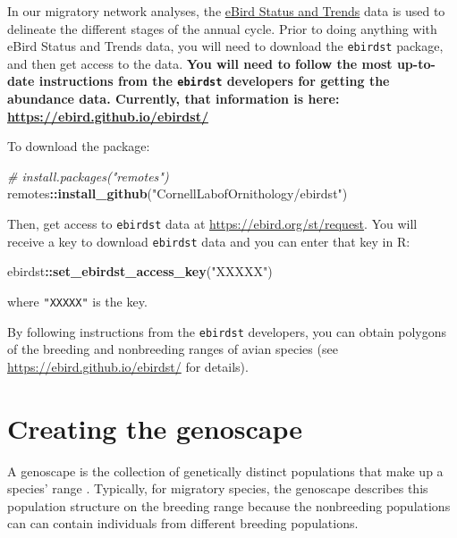 \documentclass[
]{book}
\newenvironment{Shaded}{\begin{snugshade}}{\end{snugshade}}
\newcommand{\CommentTok}[1]{\textcolor[rgb]{0.56,0.35,0.01}{\textit{#1}}}
\newcommand{\FunctionTok}[1]{\textcolor[rgb]{0.13,0.29,0.53}{\textbf{#1}}}
\newcommand{\NormalTok}[1]{#1}
\newcommand{\SpecialCharTok}[1]{\textcolor[rgb]{0.81,0.36,0.00}{\textbf{#1}}}
\newcommand{\StringTok}[1]{\textcolor[rgb]{0.31,0.60,0.02}{#1}}
\begin{document}
In our migratory network analyses, the \href{https://science.ebird.org/en/status-and-trends}{eBird Status and Trends} data is used to delineate the different stages of the annual cycle. Prior to doing anything with eBird Status and Trends data, you will need to download the \texttt{ebirdst} package, and then get access to the data. \textbf{You will need to follow the most up-to-date instructions from the \texttt{ebirdst} developers for getting the abundance data. Currently, that information is here: \url{https://ebird.github.io/ebirdst/}}

To download the package:

\begin{Shaded}
\begin{Highlighting}[]
\CommentTok{\# install.packages("remotes")}
\NormalTok{remotes}\SpecialCharTok{::}\FunctionTok{install\_github}\NormalTok{(}\StringTok{"CornellLabofOrnithology/ebirdst"}\NormalTok{)}
\end{Highlighting}
\end{Shaded}

Then, get access to \texttt{ebirdst} data at \url{https://ebird.org/st/request}. You will receive a key to download \texttt{ebirdst} data and you can enter that key in R:

\begin{Shaded}
\begin{Highlighting}[]
\NormalTok{ebirdst}\SpecialCharTok{::}\FunctionTok{set\_ebirdst\_access\_key}\NormalTok{(}\StringTok{"XXXXX"}\NormalTok{)}
\end{Highlighting}
\end{Shaded}

where \texttt{"XXXXX"} is the key.

By following instructions from the \texttt{ebirdst} developers, you can obtain polygons of the breeding and nonbreeding ranges of avian species (see \url{https://ebird.github.io/ebirdst/} for details).

\hypertarget{creating-the-genoscape}{%
\section{Creating the genoscape}\label{creating-the-genoscape}}

A genoscape is the collection of genetically distinct populations that make up a species' range \citep{ruegg2021american}. Typically, for migratory species, the genoscape describes this population structure on the breeding range because the nonbreeding populations can can contain individuals from different breeding populations.
\end{document}
